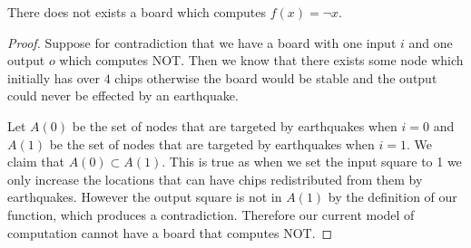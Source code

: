 \documentclass[runningheads,a4paper]{llncs}
\begin{document}
\begin{theorem}
There does not exists a board which computes $f(x) = \neg x$.
\end{theorem}

\begin{proof}
Suppose for contradiction that we have a board with one input $i$ and one output $o$ which computes NOT.  Then we know that there exists some node which initially has over $4$ chips otherwise the board would be stable and the output could never be effected by an earthquake. 

Let $A(0)$ be the set of nodes that are targeted by earthquakes when $i = 0$ and $A(1)$ be the set of nodes that are targeted by earthquakes when $i=1$.  We claim that $A(0) \subset A(1)$. This is true as when we set the input square to 1 we only increase the locations that can have chips redistributed from them by earthquakes. However the output square is not in $A(1)$ by the definition of our function, which produces a contradiction. Therefore our current model of computation cannot have a board that computes NOT. 
\end{proof}




\end{document}
